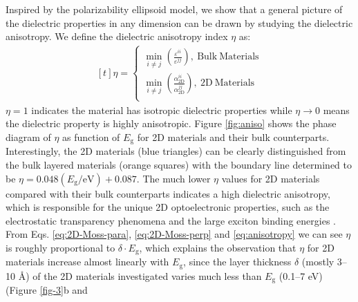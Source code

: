 
Inspired by the polarizability ellipsoid model, we show that a general picture of the dielectric properties in
any dimension can be drawn by studying the dielectric
anisotropy. We define the dielectric anisotropy index $\eta$ as:
\begin{equation}
  \label{eq:anisotropy}
  \begin{aligned}[t]
    \eta =
    \begin{cases}
      {\displaystyle \min_{i \neq j}}
      {\displaystyle
        \left(\frac{\varepsilon^{ii}}{\varepsilon^{jj}}\right)},
      \ \mathrm{Bulk\ Materials}\\
      {\displaystyle \min_{i \neq j}}
      {\displaystyle
        \left(\frac{\alpha_{\mathrm{2D}}^{ii}}{\alpha_{\mathrm{2D}}^{jj}}\right)},
      \ \mathrm{2D\ Materials}\\
    \end{cases}
  \end{aligned}
\end{equation}
$\eta=1$ indicates the material has isotropic dielectric properties
while $\eta \to 0$ means the dielectric property is highly
anisotropic. Figure \ref{fig:aniso} shows the phase diagram of $\eta$
as function of $E_{\mathrm{g}}$ for 2D materials and their bulk
counterparts. Interestingly, the 2D materials (blue triangles) can be
clearly distinguished from the bulk layered materials (orange squares)
with the boundary line determined to be
$\eta =0.048 (E_{\mathrm{g}}/ \mathrm{eV})+0.087$. The much lower
$\eta$ values for 2D materials compared with their bulk counterparts
indicates a high dielectric anisotropy, which is responsible for the
unique 2D optoelectronic properties, such as the electrostatic
transparency phenomena\cite{Liluhua_2014,Tian_2016,Li_2018} and the large exciton
binding energies
\cite{Pulci_2014,Tran_2014,Chernikov_2014_EB_MoS2_2D3D,Berkelbach_2013}. From
Eqs. \ref{eq:2D-Moss-para}, \ref{eq:2D-Moss-perp} and
\ref{eq:anisotropy} we can see $\eta$ is roughly proportional to
$\delta \cdot E_{\mathrm{g}}$, which explains the observation that
$\eta$ for 2D materials increase almost linearly with
$E_{\mathrm{g}}$, since the layer thickness $\delta$ (mostly 3--10
\AA{}) of the 2D materials investigated varies much less than
$E_{\mathrm{g}}$ (0.1--7 eV) (Figure \ref{fig-3}b and

